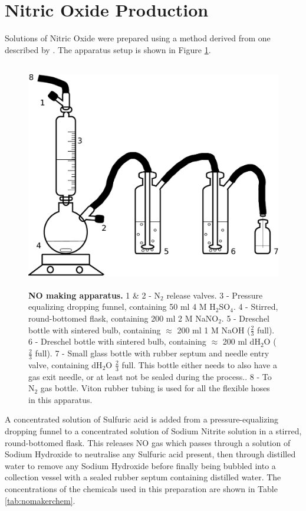\section{Nitric Oxide Production}
Solutions of Nitric Oxide were prepared using a method derived from one described by \citet{Aga2008}. The apparatus setup is shown in Figure \ref{fig:nomaker}. 
\begin{figure}[tbp]
 \centering
 \includegraphics[height=10cm]{./02-materialsmethods/data/drawing.pdf}
 \caption[NO making apparatus.]{{\bf NO making apparatus.} 1 \& 2 - N$_{\textrm{2}}$ release valves. 3 - Pressure equalizing dropping funnel, containing 50 ml 4 M H$_{\textrm{2}}$SO$_{\textrm{4}}$. 4 - Stirred, round-bottomed flask, containing 200 ml 2 M NaNO$_{\textrm{2}}$. 5 - Dreschel bottle with sintered bulb, containing $\approx$ 200 ml 1 M NaOH ($\frac{2}{3}$ full). 6 - Dreschel bottle with sintered bulb, containing $\approx$ 200 ml dH$_{\textrm{2}}$O ($\frac{2}{3}$ full). 7 - Small glass bottle with rubber septum and needle entry valve, containing dH$_{\textrm{2}}$O $\frac{2}{3}$ full. This bottle either needs to also have a gas exit needle, or at least not be sealed during the process.. 8 - To N$_{\textrm{2}}$ gas bottle. Viton rubber tubing is used for all the flexible hoses in this apparatus.
 \label{fig:nomaker}}
\end{figure}
A concentrated solution of Sulfuric acid is added from a pressure-equalizing dropping funnel to a concentrated solution of Sodium Nitrite solution in a stirred, round-bottomed flask. This releases NO gas which passes through a solution of Sodium Hydroxide to neutralise any Sulfuric acid present, then through distilled water to remove any Sodium Hydroxide before finally being bubbled into a collection vessel with a sealed rubber septum containing distilled water. The concentrations of the chemicals used in this preparation are shown in Table \ref{tab:nomakerchem}.
